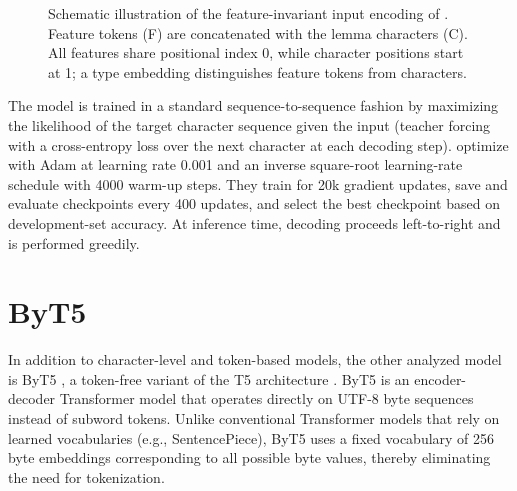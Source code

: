 \begin{figure}[t]
\centering
{}
\caption{Schematic illustration of the feature-invariant input encoding of \textcite{wu-etal-2021-applying}. Feature tokens (F) are concatenated with the lemma characters (C). All features share positional index 0, while character positions start at 1; a type embedding distinguishes feature tokens from characters.}
\label{fig:feature_invariant_encoding}
\end{figure}

The model is trained in a standard sequence-to-sequence fashion by maximizing the likelihood of the target character sequence given the input (teacher forcing with a cross-entropy loss over the next character at each decoding step). \textcite{wu-etal-2021-applying} optimize with Adam at learning rate 0.001 and an inverse square-root learning-rate schedule with 4000 warm-up steps. They train for 20k gradient updates, save and evaluate checkpoints every 400 updates, and select the best checkpoint based on development-set accuracy. At inference time, decoding proceeds left-to-right and is performed greedily.

\section{ByT5}

In addition to character-level and token-based models, the other analyzed model is ByT5 \parencite{xue-etal-2022-byt5}, a token-free variant of the T5 architecture \parencite{raffel2020t5}. ByT5 is an encoder-decoder Transformer model that operates directly on UTF-8 byte sequences instead of subword tokens. Unlike conventional Transformer models that rely on learned vocabularies (e.g., SentencePiece), ByT5 uses a fixed vocabulary of 256 byte embeddings corresponding to all possible byte values, thereby eliminating the need for tokenization.

